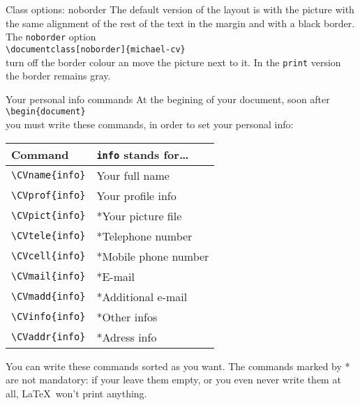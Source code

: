 \documentclass[english]{michael-cv}
\begin{document}
\begin{para}{Class options: noborder}
The default version of the layout is with the picture with the same alignment of the rest of the text in the margin and with a black border. The \texttt{noborder} option\\
\null\hspace{4ex}\verb+\documentclass[noborder]{michael-cv}+\\[2ex]
turn off the border colour an move the picture next to it. In the \texttt{print} version the border remains gray.
\end{para}

\newpage
{}

\begin{para}{Your personal info commands}
At the begining of your document, soon after\\
\null\hspace{4ex}\verb+\begin{document}+\\[2ex]
you must write these commands, in order to set your personal info:\\[2ex]
\begin{tabular}{ll}
\toprule
Command			& \texttt{info} stands for\dots	\\
\midrule
\verb+\CVname{info}+	& Your full name	\\
\verb+\CVprof{info}+	& Your profile info	\\
\verb+\CVpict{info}+	& *Your picture file	\\
\verb+\CVtele{info}+	& *Telephone number	\\
\verb+\CVcell{info}+	& *Mobile phone number	\\
\verb+\CVmail{info}+	& *E-mail		\\
\verb+\CVmadd{info}+	& *Additional e-mail	\\
\verb+\CVinfo{info}+	& *Other infos		\\
\verb+\CVaddr{info}+	& *Adress info		\\
\bottomrule
\end{tabular}

\vspace{1ex}
You can write these commands sorted as you want. The commands marked by * are not mandatory: if your leave them empty, or you even never write them at all, \LaTeX\ won't print anything.


\end{para}
\end{document}

